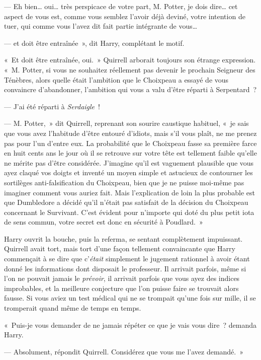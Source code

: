 --- Eh bien… oui… très perspicace de votre part, M. Potter, je dois dire… cet aspect de vous est, comme vous semblez l'avoir déjà deviné, votre intention de tuer, qui comme vous l'avez dit fait partie intégrante de vous…

--- et doit être entraînée~», dit Harry, complétant le motif.

«~Et doit être entraînée, oui.~»
Quirrell arborait toujours son étrange expression.
«~M. Potter, si vous ne souhaitez réellement pas devenir le prochain Seigneur des Ténèbres, alors quelle était l'ambition que le Choixpeau a essayé de vous convaincre d'abandonner, l'ambition qui vous a valu d'être réparti à Serpentard~?

--- J'ai été réparti à \emph{Serdaigle}~!

--- M. Potter,~» dit Quirrell, reprenant son sourire caustique habituel, «~je sais que vous avez l'habitude d'être entouré d'idiots, mais s'il vous plaît, ne me prenez pas pour l'un d'entre eux.
La probabilité que le Choixpeau fasse sa première farce en huit cents ans le jour où il se retrouve sur votre tête est tellement faible qu'elle ne mérite pas d'être considérée.
J'imagine qu'il est vaguement plausible que vous ayez claqué vos doigts et inventé un moyen simple et astucieux de contourner les sortilèges anti-falsification du Choixpeau, bien que je ne puisse moi-même pas imaginer comment vous auriez fait.
Mais l'explication de loin la plus probable est que Dumbledore a décidé qu'il n'était pas satisfait de la décision du Choixpeau concernant le Survivant.
C'est évident pour n'importe qui doté du plus petit iota de sens commun, votre secret est donc en sécurité à Poudlard.~»

Harry ouvrit la bouche, puis la referma, se sentant complètement impuissant.
Quirrell avait tort, mais tort d'une façon tellement convaincante que Harry commençait à se dire que c'\emph{était} simplement le jugement rationnel à avoir étant donné les informations dont disposait le professeur.
Il arrivait parfois, même si l'on ne pouvait jamais le \emph{prévoir}, il arrivait parfois que vous ayez des indices improbables, et la meilleure conjecture que l'on puisse faire se trouvait alors fausse.
Si vous aviez un test médical qui ne se trompait qu'une fois sur mille, il se tromperait quand même de temps en temps.

«~Puis-je vous demander de ne jamais répéter ce que je vais vous dire~? demanda Harry.

--- Absolument, répondit Quirrell.
Considérez que vous me l'avez demandé.~»

